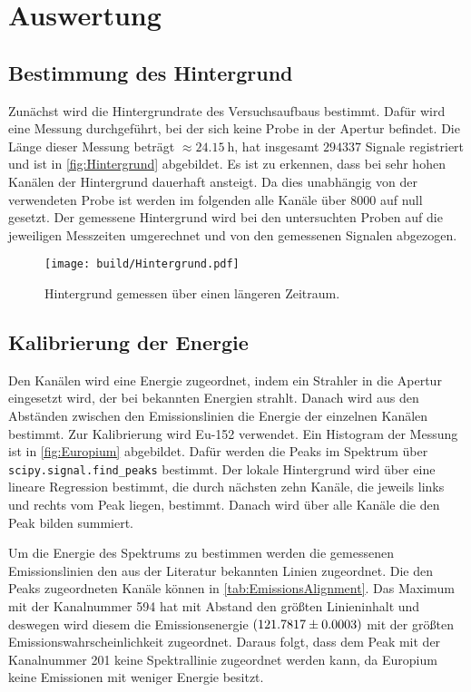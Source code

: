 \section{Auswertung}
\label{sec:auswertung}

\subsection{Bestimmung des Hintergrund}

Zunächst wird die Hintergrundrate des Versuchsaufbaus bestimmt. Dafür wird eine Messung durchgeführt, bei der sich keine Probe in der Apertur befindet.
Die Länge dieser Messung beträgt $\approx \SI{24.15}{\hour}$, hat insgesamt $294337$ Signale registriert und ist in \autoref{fig:Hintergrund} abgebildet. 
Es ist zu erkennen, dass bei sehr hohen Kanälen der Hintergrund dauerhaft ansteigt. Da dies unabhängig von der verwendeten Probe ist werden im folgenden alle Kanäle über $8000$ auf null gesetzt.
Der gemessene Hintergrund wird bei den untersuchten Proben auf die jeweiligen Messzeiten umgerechnet und von den gemessenen Signalen abgezogen.  

\begin{figure}[H]
    \centering
    \texttt{[image: build/Hintergrund.pdf]}
    \caption{Hintergrund gemessen über einen längeren Zeitraum.}
    \label{fig:Hintergrund}
\end{figure}


\subsection{Kalibrierung der Energie}

Den Kanälen wird eine Energie zugeordnet, indem ein Strahler in die Apertur eingesetzt wird, der bei bekannten Energien strahlt. 
Danach wird aus den Abständen zwischen den Emissionslinien die Energie der einzelnen Kanälen bestimmt.  
Zur Kalibrierung wird Eu-152 verwendet.
Ein Histogram der Messung ist in \autoref{fig:Europium} abgebildet.
Dafür werden die Peaks im Spektrum über \texttt{scipy.signal.find\_peaks} \cite{scipy} bestimmt.
Der lokale Hintergrund wird über eine lineare Regression bestimmt, die durch nächsten zehn Kanäle, die jeweils links und rechts vom Peak liegen, bestimmt.
Danach wird über alle Kanäle die den Peak bilden summiert.

Um die Energie des Spektrums zu bestimmen werden die gemessenen Emissionslinien den aus der Literatur \cite{LNHB} bekannten Linien zugeordnet.
Die den Peaks zugeordneten Kanäle können in \autoref{tab:EmissionsAlignment}.
Das Maximum mit der Kanalnummer 594 hat mit Abstand den größten Linieninhalt und deswegen wird diesem die Emissionsenergie $\SI{121.7817 \pm 0.0003}{}$ mit der größten Emissionswahrscheinlichkeit zugeordnet.
Daraus folgt, dass dem Peak mit der Kanalnummer 201 keine Spektrallinie zugeordnet werden kann, da Europium keine Emissionen mit weniger Energie besitzt.

